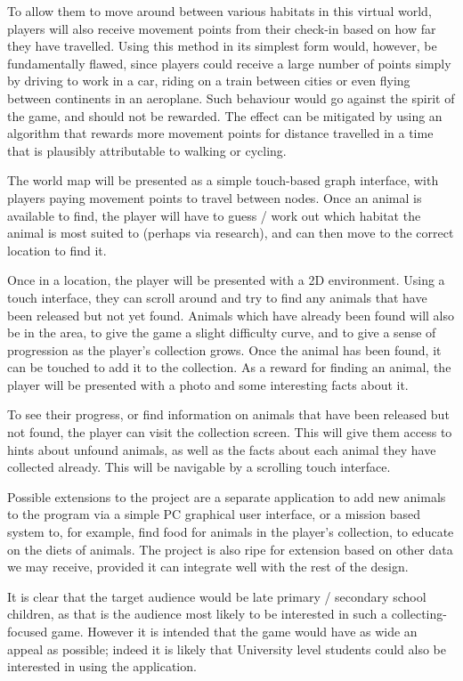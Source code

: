 \documentclass[12pt,a4paper,twoside]{article}
\begin{document}
To allow them to move around between various habitats in this virtual world, players will also receive movement points from their check-in based on how far they have travelled. 
Using this method in its simplest form would, however, be fundamentally flawed, since players could receive a large number of points simply by driving to work in a car, riding on a train between cities or even flying between continents in an aeroplane.
Such behaviour would go against the spirit of the game, and should not be rewarded.
The effect can be mitigated by using an algorithm that rewards more movement points for distance travelled in a time that is plausibly attributable to walking or cycling.

The world map will be presented as a simple touch-based graph interface, with players paying movement points to travel between nodes.
Once an animal is available to find, the player will have to guess / work out which habitat the animal is most suited to (perhaps via research), and can then move to the correct location to find it.

Once in a location, the player will be presented with a 2D environment.
Using a touch interface, they can scroll around and try to find any animals that have been released but not yet found.
Animals which have already been found will also be in the area, to give the game a slight difficulty curve, and to give a sense of progression as the player's collection grows.
Once the animal has been found, it can be touched to add it to the collection.
As a reward for finding an animal, the player will be presented with a photo and some interesting facts about it.

To see their progress, or find information on animals that have been released but not found, the player can visit the collection screen.
This will give them access to hints about unfound animals, as well as the facts about each animal they have collected already.
This will be navigable by a scrolling touch interface.

Possible extensions to the project are a separate application to add new animals to the program via a simple PC graphical user interface, or a mission based system to, for example, find food for animals in the player's collection, to educate on the diets of animals.
The project is also ripe for extension based on other data we may receive, provided it can integrate well with the rest of the design.

It is clear that the target audience would be late primary / secondary school children, as that is the audience most likely to be interested in such a collecting-focused game.
However it is intended that the game would have as wide an appeal as possible; indeed it is likely that University level students could also be interested in using the application.
\end{document}

